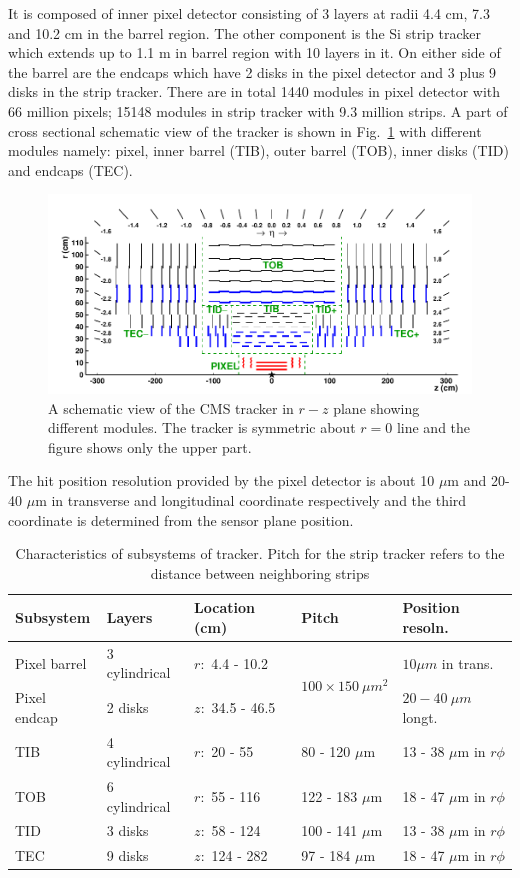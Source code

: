 It is composed of inner pixel detector consisting of 3 layers at radii 4.4 cm, 7.3 and 10.2 cm in the barrel region. The other component is the Si strip tracker which extends up to 1.1 m in barrel region with 10 layers in it. On either side of the barrel are the endcaps which have 2 disks in the pixel detector and 3 plus 9 disks in the strip tracker. There are in total 1440 modules in pixel detector with 66 million pixels; 15148 modules in strip tracker with 9.3 million strips. A part of cross sectional schematic view of the tracker \cite{Collaboration_2014} is shown in Fig.~\ref{fig:Tracker} with different modules namely: pixel, inner barrel (TIB), outer barrel (TOB), inner disks (TID) and endcaps (TEC). 

\begin{figure}[h!]
\centering
\includegraphics[width=0.95\linewidth]{../Figures/Chap2/Tracker}
\caption[CMS tracker]{A schematic view of the CMS tracker in $r-z$ plane showing different modules. The tracker is symmetric about $r=0$ line and the figure shows only the upper part.}
\label{fig:Tracker}
\end{figure}
The hit position resolution provided by the pixel detector is about 10 $\mu$m and 20-40 $\mu$m in transverse and longitudinal coordinate respectively and the third coordinate is determined from the sensor plane position.
\begin{table}[h!]
\centering
\caption[Characteristics of tracker]{Characteristics of subsystems of tracker. Pitch for the strip tracker refers to the distance between neighboring strips}
\label{tab:tracker}
\begin{tabular}{lllll}
\hline
Subsystem	&	Layers	&	Location (cm)	&	Pitch	&		Position resoln.\\\hline
Pixel barrel&	3 cylindrical	&	$r:$ 4.4 - 10.2 &	\multirow{2}{*}{$100\times150\ \mu m^2$}	&	$10\mu m$ in trans.\\
Pixel endcap&	2 disks	&		$z:$ 34.5 - 46.5	&		&	 $20-40\ \mu m$ longt.\\\hline
TIB			&	4 cylindrical & $r:$ 20 - 55 &	80 - 120 $\mu$m &	13 - 38 $\mu$m in $r\phi$\\\hline
TOB			&	6 cylindrical &	$r:$ 55 - 116&	122 - 183 $\mu$m &	18 - 47 $\mu$m in $r\phi$\\\hline
TID			&	3 disks		  &	$z:$ 58 - 124&	100 - 141 $\mu$m &	13 - 38 $\mu$m in $r\phi$\\\hline
TEC			&	9 disks		  &	$z:$ 124 - 282&	97 - 184 $\mu$m &	18 - 47 $\mu$m in $r\phi$\\\hline
\end{tabular}
\end{table}
